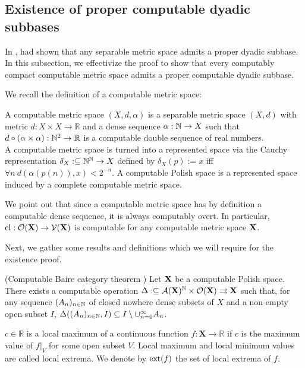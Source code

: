 \documentclass{eptcs-modified}
\begin{document}
\subsection{Existence of proper computable dyadic subbases}
\label{sec:existenceproper}

In \cite[Section 3.1]{tsukamoto},  had shown that any separable metric space admits a proper dyadic subbase.
In this subsection, we effectivize the proof to show that every computably compact computable metric space admits a proper computable dyadic subbase.

We recall the definition of a computable metric space:

\begin{definition}
A computable metric space $(X,d,\alpha)$ is a separable metric space $(X,d)$ with metric $d : X \times X \to \mathbb{R}$ and a dense sequence $\alpha : \mathbb{N} \to X$ such that $d \circ (\alpha \times \alpha ) : \mathbb{N}^2 \to \mathbb{R}$ is a computable double sequence of real numbers.\\

A computable metric space is turned into a represented space via the Cauchy representation $\delta_X :\subseteq \mathbb{N}^{\mathbb{N}} \to X$ defined by $\delta_X ( p) := x$ iff $\forall n \ d(\alpha(p(n)),x) < 2^{-n}$. A computable Polish space is a represented space induced by a complete computable metric space.
\end{definition}

We point out that since a computable metric space has by definition a computable dense sequence, it is always computably overt. In particular, $\textrm{cl} : \mathcal{O}(\mathbf{X}) \to \mathcal{V}(\mathbf{X})$ is computable for any computable metric space $\mathbf{X}$.

Next, we gather some results and definitions which we will require for the existence proof.

\begin{theorem}(Computable Baire category theorem \cite{brattka7})
Let $\mathbf{X}$ be a computable Polish space.
There exists a computable operation $\Delta :\subseteq \mathcal{A}(\mathbf{X})^{\mathbb{N}} \times \mathcal{O}(\mathbf{X}) \rightrightarrows  \mathbf{X}$ such that,  for any sequence $(A_n)_{n \in \mathbb{N}}$ of closed nowhere dense subsets of $X$ and a non-empty open subset $I$,
$\Delta((A_n)_{n \in \mathbb{N}}, I) \subseteq I \setminus \cup_{n=0}^{\infty} A_n$.
\end{theorem}

\begin{definition}
  $c \in \mathbb{R}$ is a local maximum of a continuous function $f : \mathbf{X} \to \mathbb{R}$ if $c$ is the maximum value of $f|_V$ for some open subset $V$.  Local maximum and local minimum values are called local extrema.
We denote by $\mathrm{ext}(f)$ the set of local extrema of $f$.
\end{definition}
\end{document}
